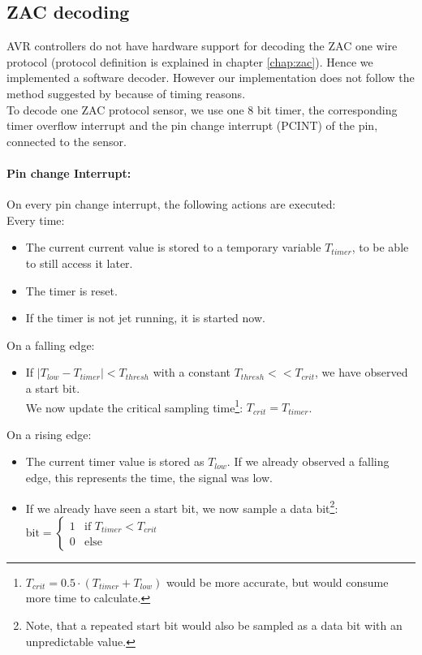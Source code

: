 \documentclass[a4paper]{scrreprt}
\begin{document}
\subsection{ZAC decoding}
AVR controllers do not have hardware support for decoding the ZAC one wire
protocol (protocol definition is explained in chapter \ref{chap:zac}). Hence we
implemented a software decoder. However our implementation
does not follow the method suggested by \cite{zac} because of timing reasons.\\
To decode one ZAC protocol sensor, we use one 8 bit timer, the corresponding timer
overflow interrupt and the pin change interrupt (PCINT) of the pin, connected to the sensor.
\paragraph{Pin change Interrupt:} On every pin change interrupt, the following actions are executed:\\
Every time:
\begin{itemize}
	\item The current current value is stored to a temporary variable $T_{timer}$, to be able to still access it later.
	\item The timer is reset.
	\item If the timer is not jet running, it is started now.
\end{itemize}
On a falling edge:
\begin{itemize}
	\item If $\left|T_{low} - T_{timer}\right| < T_{thresh}$ with a constant $T_{thresh} << T_{crit}$, we
		have observed a start bit.\\
		We now update the critical sampling time\footnote{$T_{crit} = 0.5\cdot(T_{timer} + T_{low})$ would
		be more accurate, but would consume more time to calculate.}: $T_{crit} = T_{timer}$.
\end{itemize}
On a rising edge:
\begin{itemize}
	\item The current timer value is stored as $T_{low}$. If we already observed a falling edge, this
		represents the time, the signal was low.
	\item If we already have seen a start bit, we now sample a data bit\footnote{Note, that a repeated
		start bit would also be sampled as a data bit with an unpredictable value.}:\\
	$\mathrm{bit} = \begin{cases} 1 & \text{if } T_{timer}<T_{crit} \\ 0 & \text{else}\end{cases}$
\end{itemize}
\end{document}
